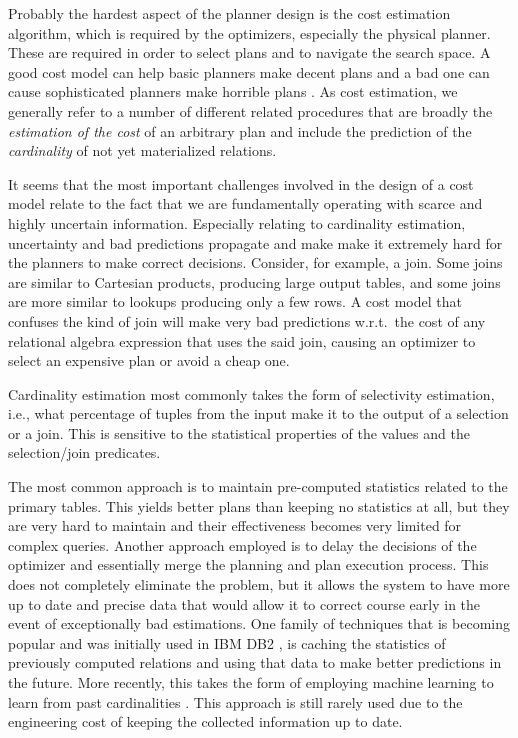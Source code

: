 Probably the hardest aspect of the planner design is the cost
estimation algorithm, which is required by the optimizers, especially
the physical planner. These are required in order to select plans and
to navigate the search space. A good cost model can help basic
planners make decent plans and a bad one can cause sophisticated
planners make horrible plans \cite{leisHowGoodAre2015}. As cost
estimation, we generally refer to a number of different related
procedures that are broadly the \emph{estimation of the cost} of an
arbitrary plan and include the prediction of the \emph{cardinality} of
not yet materialized relations.

It seems that the most important challenges involved in the design of
a cost model relate to the fact that we are fundamentally operating
with scarce and highly uncertain information. Especially relating to
cardinality estimation, uncertainty and bad predictions propagate and
make make it extremely hard for the planners to make correct
decisions. Consider, for example, a join. Some joins are similar to
Cartesian products, producing large output tables, and some joins are
more similar to lookups producing only a few rows. A cost model that
confuses the kind of join will make very bad predictions w.r.t.\ the
cost of any relational algebra expression that uses the said join,
causing an optimizer to select an expensive plan or avoid a cheap
one.

Cardinality estimation most commonly takes the form of selectivity
estimation, i.e., what percentage of tuples from the input make it to
the output of a selection or a join. This is sensitive to the
statistical properties of the values and the selection/join
predicates.

The most common approach is to maintain pre-computed statistics
related to the primary tables. This yields better plans than keeping
no statistics at all, but they are very hard to maintain and their
effectiveness becomes very limited for complex queries. Another
approach employed is to delay the decisions of the optimizer and
essentially merge the planning and plan execution process. This does
not completely eliminate the problem, but it allows the system to have
more up to date and precise data that would allow it to correct course
early in the event of exceptionally bad estimations. One family of
techniques that is becoming popular and was initially used in IBM DB2
\cite{stillgerLEODB2LearningOptimizer2001}, is caching the statistics
of previously computed relations and using that data to make better
predictions in the future. More recently, this takes the form of
employing machine learning to learn from past cardinalities
\cite{ortizEmpiricalAnalysisDeep2019}. This approach is still rarely
used due to the engineering cost of keeping the collected information
up to date.

